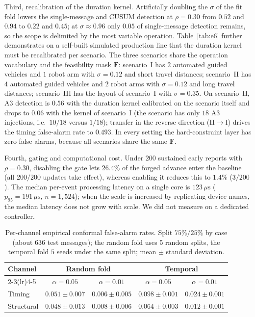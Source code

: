 \documentclass[manuscript,screen,review]{acmart}
\begin{document}
Third, recalibration of the duration kernel. Artificially doubling the $\sigma$ of the fit fold lowers the single-message and {CUSUM} detection at $\rho=0.30$ from $0.52$ and $0.94$ to $0.22$ and $0.45$; at $\sigma\approx0.96$ only $0.05$ of single-message detection remains, so the scope is delimited by the most variable operation. Table~\ref{tab:e6} further demonstrates on a self-built simulated production line that the duration kernel must be recalibrated per scenario. The three scenarios share the operation vocabulary and the feasibility mask $\mathbf F$: scenario~I has $2$ automated guided vehicles and $1$ robot arm with $\sigma=0.12$ and short travel distances; scenario~II has $4$ automated guided vehicles and $2$ robot arms with $\sigma=0.12$ and long travel distances; scenario~III has the layout of scenario~I with $\sigma=0.35$. On scenario~II, {A3} detection is $0.56$ with the duration kernel calibrated on the scenario itself and drops to $0.06$ with the kernel of scenario~I (the scenario has only $18$ {A3} injections, i.e.\ $10/18$ versus $1/18$); transfer in the reverse direction (II$\to$I) drives the timing false-alarm rate to $0.493$. In every setting the hard-constraint layer has zero false alarms, because all scenarios share the same $\mathbf F$.

Fourth, gating and computational cost. Under $200$ sustained early reports with $\rho=0.30$, disabling the gate lets $26.4\%$ of the forged advance enter the baseline (all $200/200$ updates take effect), whereas enabling it reduces this to $1.4\%$ ($3/200$). The median per-event processing latency on a single core is $123\,\mu\mathrm{s}$ ($p_{95}=191\,\mu\mathrm{s}$, $n=1{,}524$); when the scale is increased by replicating device names, the median latency does not grow with scale. We did not measure on a dedicated controller.

\begin{table}[!t]
\renewcommand{\arraystretch}{1.12}
\caption{Per-channel empirical conformal false-alarm rates. Split $75\%/25\%$ by case (about $636$ test messages); the random fold uses $5$ random splits, the temporal fold $5$ seeds under the same split; mean $\pm$ standard deviation.}
\label{tab:fprsplit}
\centering
\small
\begin{tabular}{lcccc}
\toprule
Channel & \multicolumn{2}{c}{Random fold} & \multicolumn{2}{c}{Temporal} \\
\cmidrule(lr){2-3}\cmidrule(lr){4-5}
 & $\alpha{=}0.05$ & $\alpha{=}0.01$ & $\alpha{=}0.05$ & $\alpha{=}0.01$ \\
\midrule
Timing & $0.051{\pm}0.007$ & $0.006{\pm}0.005$ & $0.098{\pm}0.001$ & $0.024{\pm}0.001$ \\
Structural & $0.048{\pm}0.013$ & $0.008{\pm}0.006$ & $0.064{\pm}0.003$ & $0.012{\pm}0.001$ \\
\bottomrule
\end{tabular}
\end{table}
\end{document}
